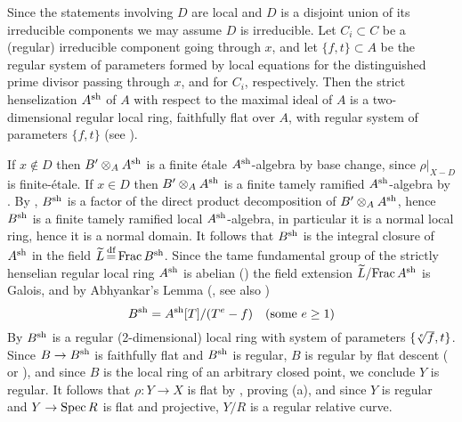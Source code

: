 \documentclass{amsart}
\theoremstyle{plain}
\theoremstyle{definition}
\theoremstyle{remark}
\numberwithin{equation}{section}%
\newcommand{\df}{{\,\overset{\text{\rm df}}{=}\,}}
\newcommand{\sh}{{\text{\rm sh}}}
\newcommand{\Frac}{{\text{\rm Frac}\,}}
\newcommand{\Spec}{{\text{\rm Spec}\,}}
\begin{document}
Since the statements involving $D$ are local and $D$ is a disjoint union of its irreducible
components we may assume $D$ is irreducible.
Let $C_i\subset C$ be a (regular) irreducible component going through $x$,
and let $\{f,t\}\subset A$ be the regular system of parameters formed by local equations for 
the distinguished prime divisor passing through $x$, and for $C_i$, respectively.
Then the strict henselization $A^\sh$ of $A$ with respect to the maximal ideal of $A$
is a two-dimensional regular local ring, faithfully flat over $A$, with regular system
of parameters $\{f,t\}$ (see \cite[18.8]{EGAIV:d}).

If $x\not\in D$ then $B'\otimes_A A^\sh$ is a finite \'etale $A^\sh$-algebra
by base change, since $\rho|_{X-D}$ is finite-\'etale.
If $x\in D$ then $B'\otimes_A A^\sh$ is a finite tamely ramified $A^\sh$-algebra
by \cite[Lemma 2.2.8]{GM}.
By \cite[18.8.10]{EGAIV:d}, $B^\sh$ is a factor of the direct product decomposition of
$B'\otimes_A A^\sh$, hence 
$B^\sh$ is a finite tamely ramified local $A^\sh$-algebra, 
in particular it is a normal local ring, hence it is a normal domain.
It follows that
$B^\sh$ is the integral closure of $A^\sh$ in the field $\widetilde L\df\Frac B^\sh$.
Since the tame fundamental group of the strictly henselian regular local ring $A^\sh$ 
is abelian (\cite[XIII.5.3]{SGA1})
the field extension $\widetilde L/\Frac A^\sh$ is Galois,
and by Abhyankar's Lemma (\cite[A.I.11]{FK}, see also \cite[Corollary 2.3.4]{GM})
$$
B^\sh=A^\sh[T]/(T^e-f)\quad(\text{some }e\geq 1)
$$ 
By \cite[Lemma 1.8.6]{GM}
$B^\sh$ is a regular (2-dimensional) local ring with system of parameters $\{\root e\of f,t\}$.
Since $B\to B^\sh$ is faithfully flat
and $B^\sh$ is regular, $B$ is regular by flat descent (\cite[6.5.1]{EGAIV:b} or \cite[23.7(i)]{Mat}), 
and since $B$ is the local ring of an arbitrary closed point, we conclude $Y$ is regular.
It follows that $\rho:Y\to X$ is flat by \cite[23.1]{Mat}, proving (a), and since $Y$ is regular
and $Y\to\Spec R$ is flat and projective, $Y/R$ is a regular relative curve.
\end{document}
